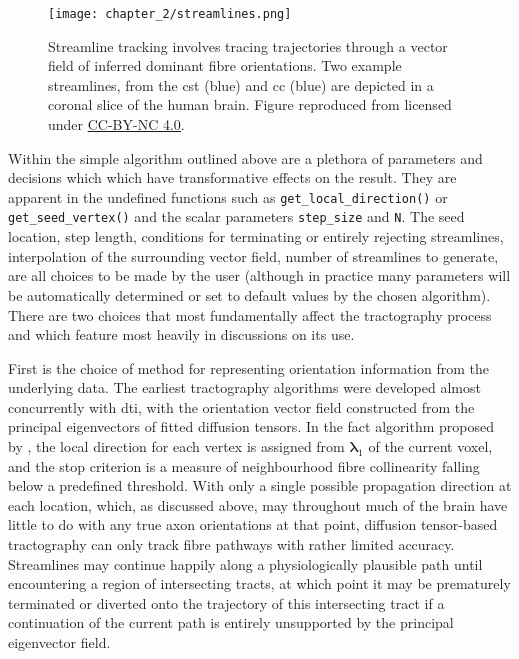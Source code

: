 \begin{figure}
  \texttt{[image: chapter\_2/streamlines.png]}
  \caption{Streamline tracking involves tracing trajectories through a vector field of inferred dominant fibre orientations. Two example streamlines, from the \gls{cst} (blue) and \gls{cc} (blue) are depicted in a coronal slice of the human brain. Figure reproduced from \textcite{Jeurissen2019} licensed under \href{https://creativecommons.org/licenses/by-nc/4.0/}{CC-BY-NC 4.0}.}
  \label{fig:tracking}
\end{figure}

Within the simple algorithm outlined above are a plethora of parameters and decisions which which have transformative effects on the result.
They are apparent in the undefined functions such as \verb|get_local_direction()| or \verb|get_seed_vertex()| and the scalar parameters \verb|step_size| and \verb|N|.
The seed location, step length, conditions for terminating or entirely rejecting streamlines, interpolation of the surrounding vector field, number of streamlines to generate, are all choices to be made by the user (although in practice many parameters will be automatically determined or set to default values by the chosen algorithm).
There are two choices that most fundamentally affect the tractography process and which feature most heavily in discussions on its use.

First is the choice of method for representing orientation information from the underlying data.
The earliest tractography algorithms were developed almost concurrently with \gls{dti}\autocite{Mori1998,Mori1999}, with the orientation vector field constructed from the principal eigenvectors of fitted diffusion tensors.
In the \gls{fact} algorithm proposed by \textcite{Mori1999}, the local direction for each vertex is assigned from $\bm{\lambda}_1$ of the current voxel, and the stop criterion is a measure of neighbourhood fibre collinearity falling below a predefined threshold.
With only a single possible propagation direction at each location, which, as discussed above, may throughout much of the brain have little to do with any true axon orientations at that point, diffusion tensor-based tractography can only track fibre pathways with rather limited accuracy.
Streamlines may continue happily along a physiologically plausible path until encountering a region of intersecting tracts, at which point it may be prematurely terminated or diverted onto the trajectory of this intersecting tract if a continuation of the current path is entirely unsupported by the principal eigenvector field.


